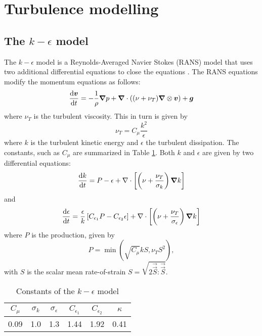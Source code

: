 \documentclass{../GPUSPHtemplate}
\begin{document}

\section{Turbulence modelling}

\subsection{The $k-\epsilon$ model}

The $k-\epsilon$ model is a Reynolds-Averaged Navier Stokes (RANS) model that
uses two additional differential equations to close the equations
\cite{pope_turbulent_2001}. The RANS equations modify the momentum
equations as follows:
\begin{equation}
\frac{\text{d} \bm{v}}{\text{d} t} = - \frac{1}{\rho}\bm{\nabla} p + \bm{\nabla} \cdot ( (\nu +
\nu_T) \bm{\nabla} \otimes \bm{v}) + \bm{g}
\label{e:turb:ns}
\end{equation}
where $\nu_T$ is the turbulent viscosity. This in turn is given by
\begin{equation}
\nu_T = C_\mu \frac{k^2}{\epsilon}
\label{e:turb:nut}
\end{equation}
where $k$ is the turbulent kinetic energy and $\epsilon$ the turbulent
dissipation. The constants, such as $C_\mu$ are summarized in Table
\ref{tab:turb:consts}. Both $k$ and $\epsilon$ are given by two
differential equations:
\begin{equation}
\frac{\text{d} k}{\text{d} t} = P - \epsilon + \nabla \cdot \left[  \left(\nu +
\frac{\nu_T}{\sigma_k}\right) \bm{\nabla} k\right]
\label{e:turb:k}
\end{equation}
and
\begin{equation}
\frac{\text{d} \epsilon}{\text{d} t} =\frac{\epsilon}{k}\left[ C_{\epsilon_1} P -
C_{\epsilon_2} \epsilon \right]+ \nabla \cdot \left[  \left(\nu +
\frac{\nu_T}{\sigma_\epsilon}\right) \bm{\nabla} k\right]
\label{e:turb:eps}
\end{equation}
where $P$ is the production, given by
\begin{equation}
P = \min(\sqrt{C_\mu} k S, \nu_T S^2),
\label{e:turb:strain}
\end{equation}
with $S$ is the scalar mean rate-of-strain $S = \sqrt{2 \vec{\vec{S}}
: \vec{\vec{S}}}$.
\begin{table}
\centering
\begin{tabular}{| c | c | c | c | c | c |}
\hline
$C_\mu$ & $\sigma_k$ & $\sigma_\epsilon$ & $C_{\epsilon_1}$ &
$C_{\epsilon_2}$ & $\kappa$
\\
\hline
0.09 & 1.0 & 1.3 & 1.44 & 1.92 & 0.41
\\
\hline
\end{tabular}
\caption{Constants of the $k-\epsilon$ model}
\label{tab:turb:consts}
\end{table}
\end{document}
